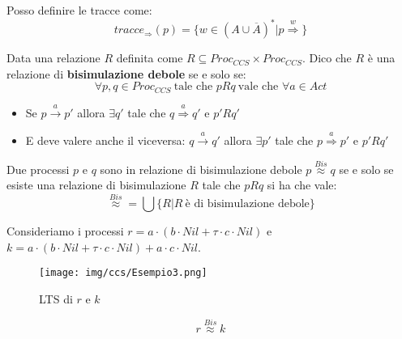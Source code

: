 Posso definire le tracce come:
\begin{equation}
    tracce_{\Rightarrow}(p) = \{w \in (A \cup \overline{A})^{\ast} | p \stackrel{w}{\Rightarrow}\}
\end{equation}
\begin{definizione}
    Data una relazione $R$ definita come $R \subseteq Proc_{CCS} \times Proc_{CCS}$.
    Dico che $R$ è una relazione di \textbf{bisimulazione debole} se e solo se:
    \begin{equation}
        \forall p, q \in Proc_{CCS} \ \text{tale che } p R q \ \text{vale che } \forall a \in Act
    \end{equation}
    \begin{itemize}
        \item Se $p \xrightarrow{a} p'$ allora $\exists q'$ tale che
              $q \stackrel{a}{\Rightarrow} q'$ e $p'Rq'$
        \item E deve valere anche il viceversa: $q \xrightarrow{a} q'$ allora
              $\exists p'$ tale che $p \stackrel{a}{\Rightarrow} p'$ e $p'Rq'$
    \end{itemize}
\end{definizione}
Due processi $p$ e $q$ sono in relazione di bisimulazione debole $p \stackrel{Bis}{\approx} q$
se e solo se esiste una relazione di bisimulazione $R$ tale che $p R q$ si ha che vale:
\begin{equation}
    \stackrel{Bis}{\approx} = \bigcup \{R | R \ \text{è di bisimulazione debole}\}
\end{equation}
\begin{esempio}
    Consideriamo i processi $r = a \cdot (b \cdot Nil + \tau \cdot c \cdot Nil)$
    e $k = a \cdot (b \cdot Nil + \tau \cdot c \cdot Nil) + a \cdot c \cdot Nil$.
    \begin{figure}[!ht]
        \centering
        \texttt{[image: img/ccs/Esempio3.png]}
        \caption{LTS di $r$ e $k$}
    \end{figure}
    $$r \stackrel{Bis}{\approx} k$$
\end{esempio}

